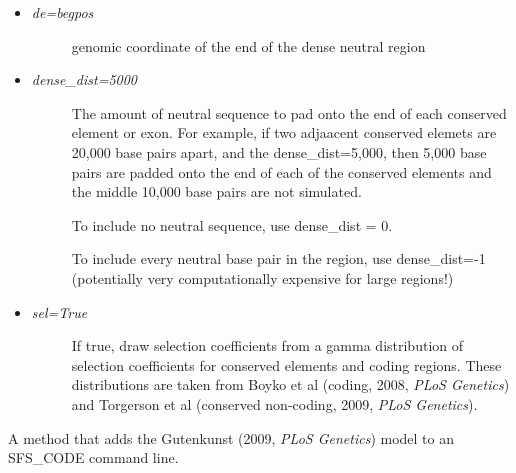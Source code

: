 \documentclass[letterpaper,10pt,english]{sphinxmanual}
\begin{document}
\begin{fulllineitems}
\begin{fulllineitems}
\begin{itemize}
\begin{itemize}
\begin{description}
\end{description}

\item {} \begin{description}
\item[{\emph{de=begpos}}] \leavevmode
genomic coordinate of the end of the dense neutral region

\end{description}

\item {} \begin{description}
\item[{\emph{dense\_dist=5000}}] \leavevmode
The amount of neutral sequence to pad onto the end of each 
conserved element or exon.  For example, if two adjaacent 
conserved elemets are 20,000 base pairs apart, and the 
dense\_dist=5,000, then 5,000 base pairs are padded onto the 
end of each of the conserved elements and the middle 10,000
base pairs are not simulated.

To include no neutral sequence, use dense\_dist = 0.

To include every neutral base pair in the region, use 
dense\_dist=-1 (potentially very computationally expensive
for large regions!)

\end{description}

\item {} \begin{description}
\item[{\emph{sel=True}}] \leavevmode
If true, draw selection coefficients from a gamma distribution 
of selection coefficients for conserved elements and coding
regions.  These distributions are taken from Boyko et al 
(coding, 2008, \emph{PLoS Genetics}) and Torgerson et al (conserved 
non-coding, 2009, \emph{PLoS Genetics}).

\end{description}

\end{itemize}

\end{itemize}

\end{fulllineitems}


\begin{fulllineitems}
\label{index:command.SFSCommand.gutenkunst}
A method that adds the Gutenkunst (2009, \emph{PLoS Genetics}) model to
an SFS\_CODE command line.


\end{fulllineitems}
\end{fulllineitems}
\end{document}
